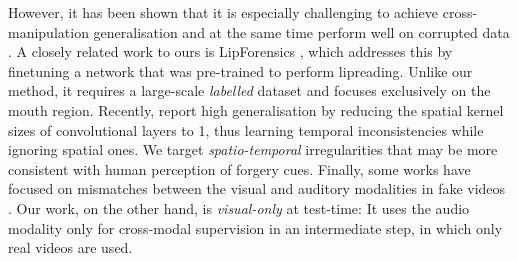 \documentclass[10pt,twocolumn,letterpaper]{article}
\begin{document}
\begin{description}[wide,itemindent=\labelsep]
However, it has been shown that it is especially challenging to achieve cross-manipulation generalisation and at the same time perform well on corrupted data \cite{haliassos2021lips}. A closely related work to ours is LipForensics \cite{haliassos2021lips}, which addresses this by finetuning a network that was pre-trained to perform lipreading. Unlike our method, it requires a large-scale \textit{labelled} dataset and focuses exclusively on the mouth region. Recently, \cite{zheng2021exploring} report high generalisation by reducing the spatial kernel sizes of convolutional layers to 1, thus learning temporal inconsistencies while ignoring spatial ones. We target \textit{spatio-temporal} irregularities that may be more consistent with human perception of forgery cues. Finally, some works have focused on mismatches between the visual and auditory modalities in fake videos \cite{zhou2021joint, mittal2020emotions, agarwal2020detecting, korshunov2018speaker, chugh2020not}. Our work, on the other hand, is \textit{visual-only} at test-time: It uses the audio modality only for cross-modal supervision in an intermediate step, in which only real videos are used.

\end{description}
\end{document}
